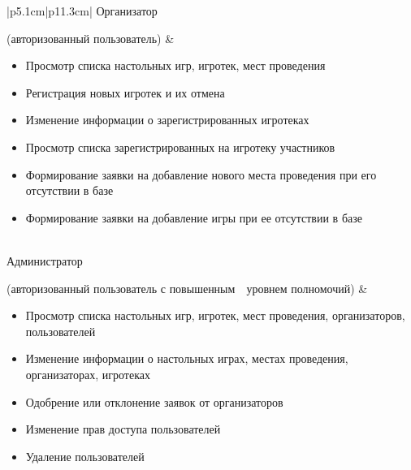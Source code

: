 \begin{table}[h!]
\begin{center}
\begin{threeparttable}
\begin{tabular}{|p{5.1cm}|p{11.3cm}|}
            Организатор \par (авторизованный пользователь)
                  & \begin{minipage}[t]{\linewidth}
                      \begin{itemize}[nosep,after=\strut]
                          \item Просмотр списка настольных игр, игротек, мест
                        проведения
                          \item Регистрация новых игротек и их отмена
                          \item Изменение информации о зарегистрированных
                              игротеках
                          \item Просмотр списка зарегистрированных на
                              \mbox{игротеку} участников
                          \item Формирование заявки на добавление нового
                              \mbox{места} проведения при его отсутствии в базе
                          \item Формирование заявки на добавление игры при ее
                        отсутствии в базе
                      \end{itemize}
                  \end{minipage}\\
            \hline
            Администратор \par (авторизованный пользователь
                    с \mbox{повышенным~~уровнем} полномочий)
                  & \begin{minipage}[t]{\linewidth}
                      \begin{itemize}[nosep,after=\strut]
                          \item Просмотр списка настольных игр, игротек, мест
                        проведения, организаторов, пользователей
                    \item Изменение информации о настольных играх, \mbox{местах}
                        проведения, организаторах, игротеках
                          \item Одобрение или отклонение заявок от
                              \mbox{организаторов}
                          \item Изменение прав доступа пользователей
                          \item Удаление пользователей
                      \end{itemize}
                  \end{minipage}\\
            \hline
        \end{tabular}
    \end{threeparttable}
    \end{center}
\end{table} 


